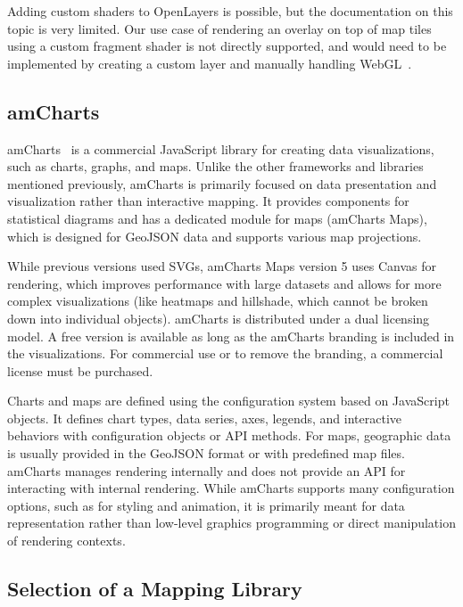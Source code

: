 Adding custom shaders to OpenLayers is possible, but the documentation on this topic is very limited. Our use case of rendering an overlay on top of map tiles using a custom fragment shader is not directly supported, and would need to be implemented by creating a custom layer and manually handling WebGL\ \cite{openlayers:githubgl}\@.

\subsection{amCharts}
amCharts~\cite{amcharts:home} is a commercial JavaScript library for creating data visualizations, such as charts, graphs, and maps. Unlike the other frameworks and libraries mentioned previously, amCharts is primarily focused on data presentation and visualization rather than interactive mapping. It provides components for statistical diagrams and has a dedicated module for maps (amCharts Maps), which is designed for GeoJSON data and supports various map projections.

While previous versions used SVGs, amCharts Maps version 5 uses Canvas for rendering, which improves performance with large datasets and allows for more complex visualizations (like heatmaps and hillshade, which cannot be broken down into individual objects)\@. amCharts is distributed under a dual licensing model. A free version is available as long as the amCharts branding is included in the visualizations. For commercial use or to remove the branding, a commercial license must be purchased.

Charts and maps are defined using the configuration system based on JavaScript objects. It defines chart types, data series, axes, legends, and interactive behaviors with configuration objects or API methods. For maps, geographic data is usually provided in the GeoJSON format or with predefined map files\@. amCharts manages rendering internally and does not provide an API for interacting with internal rendering. While amCharts supports many configuration options, such as for styling and animation, it is primarily meant for data representation rather than low-level graphics programming or direct manipulation of rendering contexts.

\subsection{Selection of a Mapping Library}

